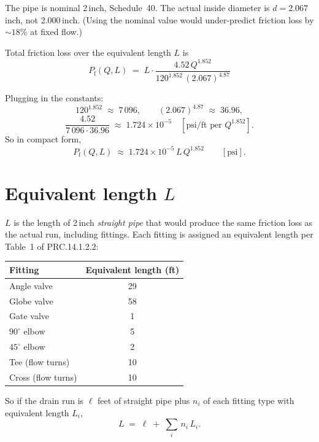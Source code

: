 \documentclass[11pt]{article}
\begin{document}
The pipe is nominal 2\,inch, Schedule~40. The actual inside diameter is
$d = 2.067$\,inch, not 2.000\,inch. (Using the nominal value would
under-predict friction loss by $\sim 18\%$ at fixed flow.)

Total friction loss over the equivalent length $L$ is
\begin{equation}
\boxed{\;P_{\text{f}}(Q, L) \;=\; L \cdot \dfrac{4.52\, Q^{1.852}}{120^{1.852}\,(2.067)^{4.87}}\;}
\label{eq:pf}
\end{equation}

Plugging in the constants:
\[
120^{1.852} \;\approx\; 7\,096, \qquad (2.067)^{4.87} \;\approx\; 36.96,
\]
\[
\dfrac{4.52}{7\,096 \cdot 36.96} \;\approx\; 1.724 \times 10^{-5}
\quad [\text{psi/ft per } Q^{1.852}].
\]
So in compact form,
\begin{equation}
P_{\text{f}}(Q, L) \;\approx\; 1.724 \times 10^{-5}\, L\, Q^{1.852}
\qquad [\text{psi}].
\label{eq:pf-numeric}
\end{equation}

\section{Equivalent length $L$}

$L$ is the length of 2\,inch \emph{straight pipe} that would produce the
same friction loss as the actual run, including fittings. Each fitting is
assigned an equivalent length per Table~1 of PRC.14.1.2.2:

\begin{center}
\begin{tabular}{lc}
\toprule
Fitting & Equivalent length (ft) \\
\midrule
Angle valve            & 29 \\
Globe valve            & 58 \\
Gate valve             & 1  \\
$90^\circ$ elbow       & 5  \\
$45^\circ$ elbow       & 2  \\
Tee (flow turns)       & 10 \\
Cross (flow turns)     & 10 \\
\bottomrule
\end{tabular}
\end{center}

So if the drain run is $\ell$ feet of straight pipe plus $n_i$ of each
fitting type with equivalent length $L_i$,
\begin{equation}
L \;=\; \ell \;+\; \sum_{i}\, n_i\, L_i.
\end{equation}
\end{document}
